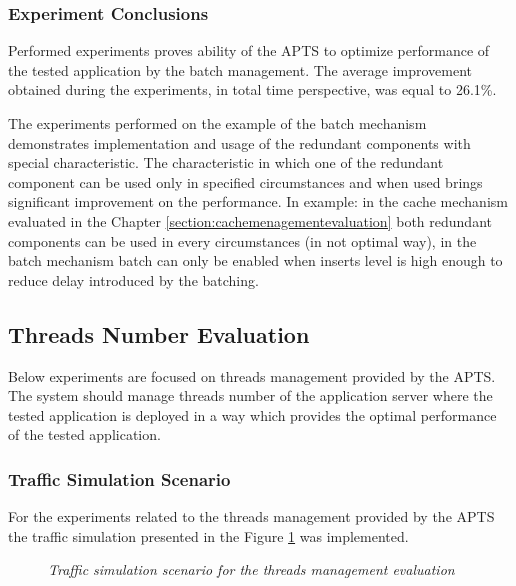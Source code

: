 \documentclass[12pt,a4paper]{article}
\begin{document}
\subsubsection{Experiment Conclusions} 

Performed experiments proves ability of the APTS to optimize performance of the tested application by the batch management. The average improvement obtained during the experiments, in total time perspective, was equal to 26.1\%. 

The experiments performed on the example of the batch mechanism demonstrates implementation and usage of the redundant components with special characteristic. The characteristic in which one of the redundant component can be used only in specified circumstances and when used brings significant improvement on the performance. In example: in the cache mechanism evaluated in the Chapter \ref{section:cachemenagementevaluation} both redundant components can be used in every circumstances (in not optimal way), in the batch mechanism batch can only be enabled when inserts level is high enough to reduce delay introduced by the batching.  


\subsection{Threads Number Evaluation}

Below experiments are focused on threads management provided by the APTS. The system should manage threads number of the application server where the tested application is deployed in a way which provides the optimal performance of the tested application. 

\subsubsection{Traffic Simulation Scenario}

For the experiments related to the threads management provided by the APTS the traffic simulation presented in the Figure \ref{figure:trafficthreads} was implemented. 

\begin{figure}[!htb]
\begin{center}
\caption{\textit{Traffic simulation scenario for the threads management evaluation}} \label{figure:trafficthreads}
\end{center}
\end{figure}
\end{document}
